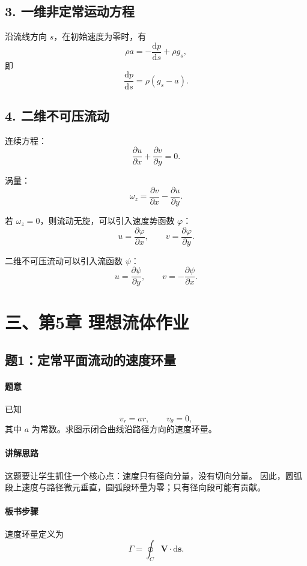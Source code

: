 \documentclass[12pt,a4paper]{ctexart}
\newcommand{\dd}{\mathrm d}
\begin{document}
\subsection*{3. 一维非定常运动方程}

沿流线方向 $s$，在初始速度为零时，有
\[
\rho a=-\frac{\dd p}{\dd s}+\rho g_s ,
\]
即
\[
\frac{\dd p}{\dd s}=\rho(g_s-a).
\]

\subsection*{4. 二维不可压流动}

连续方程：
\[
\frac{\partial u}{\partial x}
+\frac{\partial v}{\partial y}=0.
\]

涡量：
\[
\omega_z=
\frac{\partial v}{\partial x}
-\frac{\partial u}{\partial y}.
\]

若 $\omega_z=0$，则流动无旋，可以引入速度势函数 $\varphi$：
\[
u=\frac{\partial\varphi}{\partial x},\qquad
v=\frac{\partial\varphi}{\partial y}.
\]

二维不可压流动可以引入流函数 $\psi$：
\[
u=\frac{\partial\psi}{\partial y},\qquad
v=-\frac{\partial\psi}{\partial x}.
\]

\section*{三、第5章 理想流体作业}

\subsection*{题1：定常平面流动的速度环量}

\paragraph{题意}
已知
\[
v_r=ar,\qquad v_\theta=0,
\]
其中 $a$ 为常数。求图示闭合曲线沿路径方向的速度环量。

\paragraph{讲解思路}
这题要让学生抓住一个核心点：速度只有径向分量，没有切向分量。
因此，圆弧段上速度与路径微元垂直，圆弧段环量为零；只有径向段可能有贡献。

\paragraph{板书步骤}
速度环量定义为
\[
\Gamma=\oint_C \bm V\cdot \dd \bm s .
\]
\end{document}
